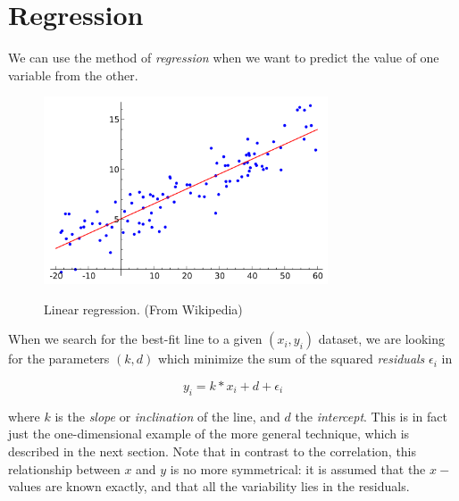 

\section{Regression} 

We can use the method of \emph{regression} when we want to predict the value of one variable from the other.

\begin{figure}
  \centering
  \includegraphics[width=0.75\textwidth]{../Images/Linear_regression.png}\\
  \caption{Linear regression. (From Wikipedia)}\label{fig:regression}
\end{figure}

When we search for the best-fit line to a given $(x_i,y_i)$ dataset, we are looking for the parameters $(k,d)$ which minimize the sum of the squared \emph{residuals} $\epsilon_i$ in

\begin{equation}\label{eq:simpleRegression}
  y_i = k * x_i + d + \epsilon_i
\end{equation}

where $k$ is the \emph{slope} or \emph{inclination} of the line, and $d$ the \emph{intercept}. This is in fact just the one-dimensional example of the more general technique, which is described in the next section.
Note that in contrast to the correlation, this relationship between $x$ and $y$ is no more symmetrical: it is assumed that the $x-$values are known exactly, and that all the variability lies in the residuals.

